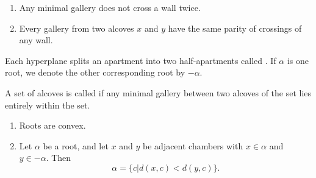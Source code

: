 \documentclass[11pt]{article}
\begin{document}
\begin{lemma}
    \begin{enumerate}
        \item Any minimal gallery does not cross a wall twice.
        \item Every gallery from two alcoves $x$ and $y$ have the same parity of crossings of any wall.
    \end{enumerate}
\end{lemma}

\begin{definition}
    Each hyperplane splits an apartment into two half-apartments called . If $\alpha$ is one root, we denote the other corresponding root by $-\alpha$. 
\end{definition}


\begin{definition}
    A set of alcoves is called  if any minimal gallery between two alcoves of the set lies entirely within the set. 
\end{definition}

\begin{proposition}
    \begin{enumerate}
        \item Roots are convex.
        \item Let $\alpha$ be a root, and let $x$ and $y$ be adjacent chambers with $x\in\alpha$ and $y\in -\alpha$. Then
        \[\alpha =\{c|d(x,c)<d(y,c)\}.\]
    \end{enumerate}
\end{proposition}
\end{document}
